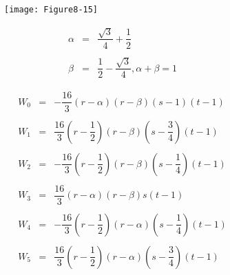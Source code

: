 \begin{description}
    \begin{figure}[!htb]
        \centering
        \begin{subfigure}{0.48\linewidth}
            \centering
            \texttt{[image: Figure8-15]}
            \caption*{}
        \end{subfigure}
        \hfill
        \begin{subfigure}{0.48\linewidth}
            \centering
            \begin{equation*}
            \begin{array}{lll}
            \alpha &=& \dfrac{\sqrt{3}}{4} + \dfrac{1}{2} \\ \\
            \beta &=& \dfrac{1}{2} - \dfrac{\sqrt{3}}{4}, \alpha + \beta = 1
            \end{array}
            \end{equation*}
        \end{subfigure}
        \hfill
        \begin{subfigure}{0.48\linewidth}
            \centering
            \begin{equation*}
            \begin{array}{lll}
            W_0 &=&-\dfrac{16}{3}(r - \alpha)(r - \beta)(s - 1)(t - 1) \\ \\
            W_1 &=&\dfrac{16}{3}(r - \dfrac{1}{2})(r - \beta)(s - \dfrac{3}{4})(t - 1) \\ \\
            W_2 &=& -\dfrac{16}{3}(r - \dfrac{1}{2})(r - \beta)(s - \dfrac{1}{4})(t - 1) \\ \\
            W_3 &=& \dfrac{16}{3}(r - \alpha)(r - \beta)s(t - 1) \\ \\
            W_4 &=& -\dfrac{16}{3}(r - \dfrac{1}{2})(r - \alpha)(s - \dfrac{1}{4})(t - 1) \\ \\
            W_5 &=& \dfrac{16}{3}(r - \dfrac{1}{2})(r - \alpha)(s - \dfrac{3}{4})(t - 1)
            \end{array}
            \end{equation*}
        \end{subfigure}%
        \hfill
        \begin{subfigure}{0.48\linewidth}
            \centering
            \begin{equation*}
            \begin{array}{lll}

\end{array}
\end{equation*}
\end{subfigure}
\end{figure}
\end{description}
